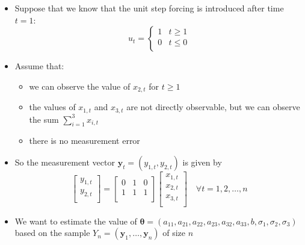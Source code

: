 \documentclass[12pt,a4paper]{article}
\begin{document}
\begin{itemize}
\begin{itemize}
\begin{equation}
\begin{bmatrix}
        \end{bmatrix},
        \begin{bmatrix}
          \sigma_{1}^{2} & 0 & 0 \\
          0 & \sigma_{2}^{2} & 0 \\
          0 & 0 & \sigma_{3}^{2} \\
        \end{bmatrix}
      \right)
    \end{equation}
  \item Suppose that we know that the unit step forcing is introduced after time $t=1$:
    \begin{equation}\nonumber%
      u_{t} =
      \begin{cases}
        1 & t \geq 1 \\
        0 & t \leq 0 \\
      \end{cases}
    \end{equation}
  \item Assume that:
    \begin{itemize}
    \item we can observe the value of $x_{2,t}$ for $t\geq 1$
    \item the values of $x_{1,t}$ and $x_{3,t}$
      are not directly observable, but we can observe the sum $\sum_{i=1}^{3}x_{i,t}$
    \item there is no measurement error
    \end{itemize}
  \item So the measurement vector $\bm{y}_{t}=(y_{1,t}, y_{2,t})$ is given by
    \begin{equation}\nonumber%
      \begin{bmatrix}
        y_{1,t} \\
        y_{2,t} \\
      \end{bmatrix}
      =
      \begin{bmatrix}
        0 & 1 & 0 \\
        1 & 1 & 1 \\
      \end{bmatrix}
      \begin{bmatrix}
        x_{1,t} \\
        x_{2,t} \\
        x_{3,t} \\
      \end{bmatrix}
      \quad \forall t = 1, 2, \ldots, n
    \end{equation}
  \item We want to estimate the value of $\bm{\theta}=(a_{11}, a_{21}, a_{22}, a_{23}, a_{32}, a_{33}, b, \sigma_{1}, \sigma_{2}, \sigma_{3})$
    based on the sample $Y_{n}=(\bm{y}_{1},\ldots, \bm{y}_{n})$ of size $n$


\end{itemize}
\end{itemize}
\end{document}
